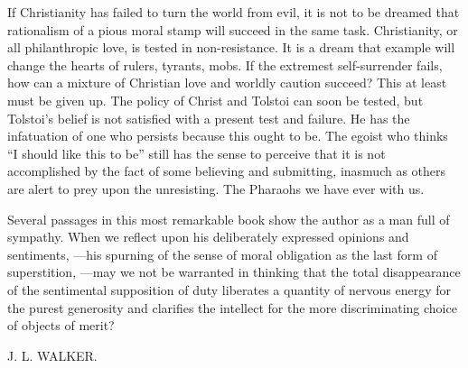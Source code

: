 If Christianity has failed to turn the world from evil, it is not to be 
dreamed that rationalism of a pious moral stamp will succeed in the same task. 
Christianity, or all philanthropic love, is tested in non-resistance. It is a 
dream that example will change the hearts of rulers, tyrants, mobs. If the 
extremest self-surrender fails, how can a mixture of Christian love and 
worldly caution succeed? This at least must be given up. The policy of Christ 
and Tolstoi can soon be tested, but Tolstoi's belief is not satisfied with a 
present test and failure. He has the infatuation of one who persists because 
this ought to be. The egoist who thinks ``I should like this to be'' still 
has the sense to perceive that it is not accomplished by the fact of some 
believing and submitting, inasmuch as others are alert to prey upon the 
unresisting. The Pharaohs we have ever with us.

Several passages in this most remarkable book show the author as a man full of 
sympathy. When we reflect upon his deliberately expressed opinions and 
sentiments, ---his spurning of the sense of moral obligation as the last form 
of superstition, ---may we not be warranted in thinking that the total 
disappearance of the sentimental supposition of duty liberates a quantity of 
nervous energy for the purest generosity and clarifies the intellect for the 
more discriminating choice of objects of merit?

\begin{flushright}
J. L. WALKER.\end{flushright}

